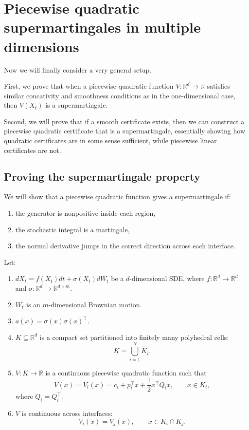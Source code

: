 \section{Piecewise quadratic supermartingales in multiple dimensions}

Now we will finally consider a very general setup. 

First, we prove that when a piecewise-quadratic function $V : \mathbb{R}^d \to \mathbb{R}$ 
satisfies similar concativity and smoothness conditions as in the one-dimensional case, then $V(X_t)$ is a supermartingale.

Second, we will prove that if a smooth certificate exists, then we can construct a piecewise quadratic certificate that is a supermartingale,
essentially showing how quadratic certificates are in some sense sufficient, while piecewise linear certificates are not.

\subsection{Proving the supermartingale property}

We will show that a piecewise quadratic function gives a supermartingale if:
\begin{enumerate}
\item the generator is nonpositive inside each region,
\item the stochastic integral is a martingale,
\item the normal derivative jumps in the correct direction across each
interface.
\end{enumerate}

\begin{setup}
Let:
\begin{enumerate}
\item $dX_t = f(X_t)dt + \sigma(X_t)dW_t$ be a $d$-dimensional SDE, where
$f:\mathbb{R}^d \to \mathbb{R}^d$ and
$\sigma:\mathbb{R}^d \to \mathbb{R}^{d \times m}$.
\item $W_t$ is an $m$-dimensional Brownian motion.
\item $a(x) = \sigma(x)\sigma(x)^\top$.
\item $K \subseteq \mathbb{R}^d$ is a compact set partitioned into finitely
many polyhedral cells:
\[
K = \bigcup_{i=1}^N K_i.
\]
\item $V:K \to \mathbb{R}$ is a continuous piecewise quadratic function such
that
\[
V(x) = V_i(x)
=
c_i + p_i^\top x + \frac{1}{2}x^\top Q_i x,
\qquad x \in K_i,
\]
where $Q_i = Q_i^\top$.
\item $V$ is continuous across interfaces:
\[
V_i(x) = V_j(x),
\qquad x \in K_i \cap K_j.
\]
\end{enumerate}
\end{setup}

